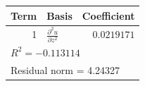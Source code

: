 \begin{tabular}{r l r}
\toprule
Term & Basis & Coefficient \\
\midrule
1 & $\frac{\partial^{2} u}{\partial z^{2}}$ & $0.0219171$ \\
\midrule
\multicolumn{3}{l}{$R^{2} = -0.113114$} \\
\multicolumn{3}{l}{Residual norm = 4.24327} \\
\bottomrule
\end{tabular}